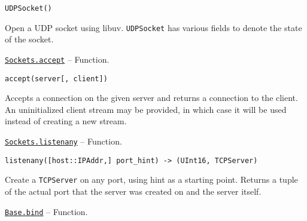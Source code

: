 \begin{adjustwidth}{2em}{0pt}


\begin{verbatim}
UDPSocket()
\end{verbatim}

Open a UDP socket using libuv. \texttt{UDPSocket} has various fields to denote the state of the socket.



\end{adjustwidth}
\hypertarget{1426793569216032849}{}
\hyperlink{1426793569216032849}{\texttt{Sockets.accept}}  -- {Function.}

\begin{adjustwidth}{2em}{0pt}


\begin{verbatim}
accept(server[, client])
\end{verbatim}

Accepts a connection on the given server and returns a connection to the client. An uninitialized client stream may be provided, in which case it will be used instead of creating a new stream.



\end{adjustwidth}
\hypertarget{9909318444396548981}{}
\hyperlink{9909318444396548981}{\texttt{Sockets.listenany}}  -- {Function.}

\begin{adjustwidth}{2em}{0pt}


\begin{verbatim}
listenany([host::IPAddr,] port_hint) -> (UInt16, TCPServer)
\end{verbatim}

Create a \texttt{TCPServer} on any port, using hint as a starting point. Returns a tuple of the actual port that the server was created on and the server itself.



\end{adjustwidth}
\hypertarget{13811388816704022260}{}
\hyperlink{13811388816704022260}{\texttt{Base.bind}}  -- {Function.}


